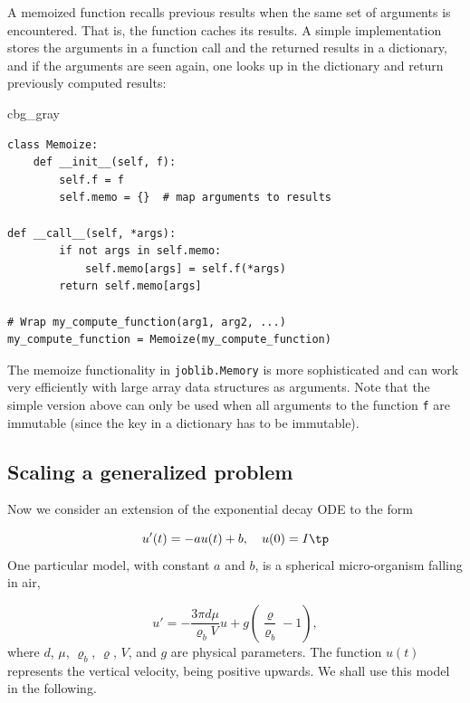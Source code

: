 \documentclass[graybox,envcountchap,sectrefs,final]{svmonodo}
\newenvironment{_cod_tight}[1]{
   \def\FrameCommand{\colorbox{#1}}
   \FrameRule0.6pt\MakeFramed {\FrameRestore}\vskip3mm}
   {\vskip0mm\endMakeFramed}
\newenvironment{cod}[1]{
\bgroup\rmfamily
\fboxsep=0mm\relax
\begin{_cod_tight}{#1}
\list{}{\parsep=-2mm\parskip=0mm\topsep=0pt\leftmargin=2mm
\rightmargin=2\leftmargin\leftmargin=4pt\relax}
\item\relax}
{\endlist\end{_cod_tight}\egroup}
\newenvironment{notice_mdfboxadmon}[1][]{
\begin{notice_mdfboxmdframed}[frametitle=#1]
}
{
\end{notice_mdfboxmdframed}
}
\begin{document}
\begin{notice_mdfboxadmon}
A memoized function recalls
previous results when the same set
of arguments is encountered. That is, the function caches its results.
A simple implementation stores the arguments in a function call and
the returned results in a
dictionary, and if the arguments are seen again, one looks up
in the dictionary and return previously computed results:

\begin{cod}{cbg_gray}\begin{Verbatim}[numbers=none,fontsize=\fontsize{9pt}{9pt},baselinestretch=0.95,xleftmargin=2mm]
class Memoize:
    def __init__(self, f):
        self.f = f
        self.memo = {}  # map arguments to results

def __call__(self, *args):
        if not args in self.memo:
            self.memo[args] = self.f(*args)
        return self.memo[args]

# Wrap my_compute_function(arg1, arg2, ...)
my_compute_function = Memoize(my_compute_function)
\end{Verbatim}
\end{cod}
\noindent
The memoize functionality in \texttt{joblib.Memory} is more sophisticated and
can work very efficiently with large array data structures as arguments.
Note that the simple version above can only be used when all arguments to
the function \texttt{f} are immutable (since the key in a dictionary has to be
immutable).
\end{notice_mdfboxadmon}



\subsection{Scaling a generalized problem}
\label{sec:scale:decay:body}

Now we consider an extension of the exponential decay ODE to the
form

\begin{equation}
u'(t) = -au(t) + b,\quad u(0)=I
\label{scale:decay:model:g}
\tp
\end{equation}
One particular model, with constant $a$ and $b$,
is a spherical micro-organism falling in air,

\begin{equation}
u' = - \frac{3\pi d\mu}{\varrho_b V} u + g\left(\frac{\varrho}{\varrho_b} -1\right),
\label{scale:decay:model:g:spec}
\end{equation}
where $d$, $\mu$, $\varrho_b$, $\varrho$, $V$, and $g$ are physical
parameters. The function $u(t)$ represents the vertical velocity,
being positive upwards.
We shall use this model in the following.
\end{document}
